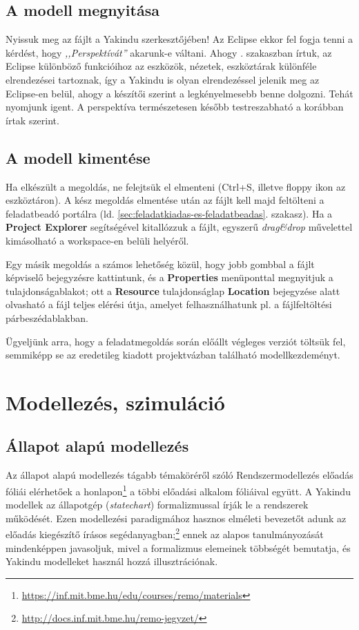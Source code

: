 \subsection{A modell megnyitása}

Nyissuk meg az  fájlt a Yakindu szerkesztőjében! Az Eclipse ekkor fel fogja tenni a kérdést, hogy \emph{,,Perspektívát''} akarunk-e váltani. Ahogy . szakaszban írtuk, az Eclipse különböző funkcióihoz az eszközök, nézetek, eszköztárak különféle elrendezései tartoznak, így a Yakindu is olyan elrendezéssel jelenik meg az Eclipse-en belül, ahogy a készítői szerint a legkényelmesebb benne dolgozni. Tehát nyomjunk igent. A perspektíva természetesen később testreszabható a korábban írtak szerint.

\subsection{A modell kimentése}
\label{sec:a-modell-kimentese}

Ha elkészült a megoldás, ne felejtsük el elmenteni (Ctrl+S, illetve floppy ikon az eszköztáron). A kész megoldás elmentése után az  fájlt kell majd feltölteni a feladatbeadó portálra (ld. \ref{sec:feladatkiadas-es-feladatbeadas}. szakasz). Ha a \textbf{Project Explorer} segítségével kitallózzuk a fájlt, egyszerű \emph{drag\&drop} művelettel kimásolható a workspace-en belüli helyéről.

Egy másik megoldás a számos lehetőség közül, hogy jobb gombbal a fájlt képviselő bejegyzésre kattintunk, és a \textbf{Properties} menüponttal megnyitjuk a tulajdonságablakot; ott a \textbf{Resource} tulajdonságlap \textbf{Location} bejegyzése alatt olvasható a fájl teljes elérési útja, amelyet felhasználhatunk pl. a fájlfeltöltési párbeszédablakban.

Ügyeljünk arra, hogy a feladatmegoldás során előállt végleges verziót töltsük fel, semmiképp se az eredetileg kiadott projektvázban található modellkezdeményt.


\section{Modellezés, szimuláció}

\subsection{Állapot alapú modellezés}

Az állapot alapú modellezés tágabb témaköréről szóló Rendszermodellezés előadás fóliái elérhetőek a honlapon\footnote{\url{https://inf.mit.bme.hu/edu/courses/remo/materials}} a többi előadási alkalom fóliáival együtt. A Yakindu modellek az állapotgép (\emph{statechart}) formalizmussal írják le a rendszerek működését. Ezen modellezési paradigmához hasznos elméleti bevezetőt adunk az előadás kiegészítő írásos segédanyagban;\footnote{\url{http://docs.inf.mit.bme.hu/remo-jegyzet/}} ennek az alapos tanulmányozását mindenképpen javasoljuk, mivel a formalizmus elemeinek többségét bemutatja, és Yakindu modelleket használ hozzá illusztrációnak.


